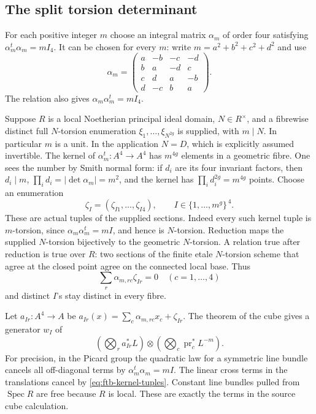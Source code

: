 \subsection{The split torsion determinant}
For each positive integer \(m\) choose an integral matrix
\(\alpha_m\) of order four satisfying
\(\alpha_m^t\alpha_m=mI_4\).
It can be chosen for every \(m\): write \(m=a^2+b^2+c^2+d^2\)
and use
\[
 \alpha_m=
 \begin{pmatrix}
 a&-b&-c&-d\\ b&a&-d&c\\
 c&d&a&-b\\d&-c&b&a
 \end{pmatrix}.
 \tag{K5}\label{eq:ftb-quaternion}
\]
The relation also gives \(\alpha_m\alpha_m^t=mI_4\).

Suppose \(R\) is a local Noetherian principal ideal domain,
\(N\in R^\times\), and a fibrewise distinct full \(N\)-torsion enumeration
\(\xi_1,\ldots,\xi_{N^{2g}}\) is supplied, with \(m\mid N\).
In particular \(m\) is a unit.  In the application \(N=D\),
which is explicitly assumed invertible.
The kernel of \(\alpha_m^t:A^4\to A^4\) has
\(m^{4g}\) elements in a geometric fibre.
One sees the number by Smith normal form:
if \(d_i\) are its four invariant factors, then \(d_i\mid m\),
\(\prod_i d_i=|\det\alpha_m|=m^2\), and the kernel has
\(\prod_i d_i^{2g}=m^{4g}\) points.
Choose an enumeration
\[
 \zeta_I=(\zeta_{I1},\ldots,\zeta_{I4}),
 \qquad I\in\{1,\ldots,m^g\}^{\,4}.
\]
These are actual tuples of the supplied sections.
Indeed every such kernel tuple is \(m\)-torsion, since
\(\alpha_m\alpha_m^t=mI\), and hence is \(N\)-torsion.
Reduction maps the supplied \(N\)-torsion bijectively to the
geometric \(N\)-torsion.  A relation true after reduction is true
over \(R\): two sections of the finite etale \(N\)-torsion scheme
that agree at the closed point agree on the connected local base.
Thus
\[
 \sum_r\alpha_{m,rc}\zeta_{Ir}=0\quad(c=1,\ldots,4)
 \tag{K6}\label{eq:ftb-kernel-tuples}
\]
and distinct \(I\)'s stay distinct in every fibre.

Let \(a_{Ir}:A^4\to A\) be
\(a_{Ir}(x)=\sum_c\alpha_{m,rc}x_c+\zeta_{Ir}\).
The theorem of the cube gives a generator \(w_I\) of
\[
 \left(\bigotimes_r a_{Ir}^*L\right)
       \otimes\left(\bigotimes_c\operatorname{pr}_c^*L^{-m}\right).
 \tag{K7}\label{eq:ftb-box-generator}
\]
For precision, in the Picard group the quadratic law for a symmetric
line bundle cancels all off-diagonal terms by
\(\alpha_m^t\alpha_m=mI\).
The linear cross terms in the translations cancel by
\eqref{eq:ftb-kernel-tuples}.  Constant line bundles pulled from
\(\operatorname{Spec}R\) are free because \(R\) is local.
These are exactly the terms in the source cube calculation.

